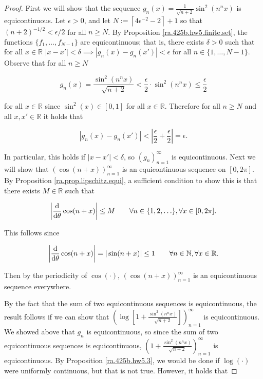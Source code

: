 \begin{proof}

First we will show that the sequence \(g_n(x) =  \frac{1}{\sqrt{n+2}} \sin^2(n^nx) \) is equicontinuous. Let \(\epsilon > 0\), and let \(N  := \left\lceil 4\epsilon^{-2} - 2 \right\rceil + 1\) so that \((n+2)^{-1/2} < \epsilon/2\) for all \(n \geq N\). By Proposition \ref{ra.425b.hw5.finite.set}, the functions \(\{f_1, \ldots, f_{N-1}\}\) are equicontinuous; that is, there exists \(\delta > 0\) such that for all \(x \in \mathbb{R}\) \(|x - x'| < \delta \implies |g_n(x) - g_n(x')| < \epsilon\) for all \(n \in \{1, \ldots, N-1\}\). Observe that for all \(n \geq N\)

\[
g_n(x) = \frac{\sin^2(n^n x)}{\sqrt{n+2}} < \frac{\epsilon}{2} \cdot \sin^2(n^n x) \leq \frac{\epsilon}{2}
\]

for all \(x \in \mathbb{R}\) since \(\sin^2( x) \in [0,1]\) for all \(x \in \mathbb{R}\). Therefore for all \(n \geq N\) and all \(x, x' \in \mathbb{R}\) it holds that

\[
 |g_n(x) - g_n(x')| <  \left|\frac{\epsilon}{2} + \frac{\epsilon}{2} \right| = \epsilon.
 \]
 
 In particular, this holds if \(|x - x'| < \delta\), so \((g_n)_{n=1}^\infty\) is equicontinuous. Next we will show that \((\cos(n+x))_{n=1}^\infty\) is an equicontinuous sequence on \([0, 2\pi]\). By Proposition \ref{ra.prop.lipschitz.equi}, a sufficient condition to show this is that there exists \(M \in \mathbb{R}\) such that 

\[
\left| \deriv{}{\theta} \cos(n+x) \right| \leq M  \qquad \forall n \in \{1, 2, \ldots\}, \forall x \in [0, 2\pi].
\]

This follows since

\[
\left| \deriv{}{\theta} \cos(n+x) \right| = | \sin(n + x)| \leq 1 \qquad \forall n \in \mathbb{N}, \forall x \in \mathbb{R}.
\]

Then by the periodicity of \(\cos(\cdot)\), \((\cos(n+x))_{n=1}^\infty\) is an equicontinuous sequence everywhere. 

By the fact that the sum of two equicontinuous sequences is equicontinuous, the result follows if we can show that \(\left( \log \left[ 1 +  \frac{\sin^2(n^n x)}{\sqrt{n+2}} \right] \right)_{n=1}^\infty\) is equicontinuous. We showed above that \(g_n\) is equicontinuous, so since the sum of two equicontinuous sequences is equicontinuous, \(\left( 1 +  \frac{\sin^2(n^n x)}{\sqrt{n+2}} \right)_{n=1}^\infty\) is equicontinuous. By Proposition \ref{ra.425b.hw5.3}, we would be done if \(\log(\cdot)\) were uniformly continuous, but that is not true. However, it holds that 


\end{proof}
